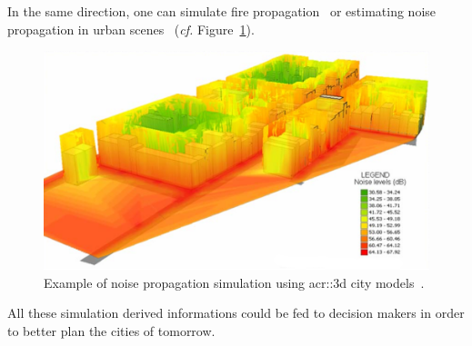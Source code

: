             In the same direction, one can simulate fire propagation~\parencite{dimitropoulos2010fire} or estimating noise propagation in urban scenes~\parencite{stoter20083d} (\textit{cf.} Figure~\ref{fig::noise_propogation}).
            \begin{figure}[htpb]
                \centering
                \includegraphics[width=\textwidth]{images/3d_model_applications/noise_simulation}
                \caption{
                    \label{fig::noise_propogation} Example of noise propagation simulation using \gls{acr::3d} city models~\parencite{kurakula2007gis}.
                }
            \end{figure}
            All these simulation derived informations could be fed to decision makers in order to better plan the cities of tomorrow.

